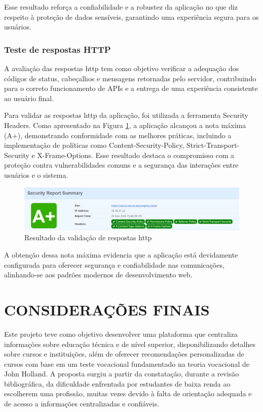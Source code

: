 Esse resultado reforça a confiabilidade e a robustez da aplicação no que diz respeito à proteção de dados sensíveis, garantindo uma experiência segura para os usuários.

\subsection{Teste de respostas HTTP}
A avaliação das respostas \ac{http} tem como objetivo verificar a adequação dos códigos de status, cabeçalhos e mensagens retornadas pelo servidor, contribuindo para o correto funcionamento de APIs e a entrega de uma experiência consistente ao usuário final.

Para validar as respostas \ac{http} da aplicação, foi utilizada a ferramenta Security Headers. Como apresentado na Figura \ref{fig:http}, a aplicação alcançou a nota máxima (A+), demonstrando conformidade com as melhores práticas, incluindo a implementação de políticas como Content-Security-Policy, Strict-Transport-Security e X-Frame-Options. Esse resultado destaca o compromisso com a proteção contra vulnerabilidades comuns e a segurança das interações entre usuários e o sistema.

\begin{figure}[ht]
        \centering
\includegraphics[width=1.0\textwidth]{images/http.png}
        \caption{Resultado da validação de respostas http}
        \label{fig:http}
\end{figure}


A obtenção dessa nota máxima evidencia que a aplicação está devidamente configurada para oferecer segurança e confiabilidade nas comunicações, alinhando-se aos padrões modernos de desenvolvimento web.


\chapter{CONSIDERAÇÕES FINAIS}

Este projeto teve como objetivo desenvolver uma plataforma que centraliza informações sobre educação técnica e de nível superior, disponibilizando detalhes sobre cursos e instituições, além de oferecer recomendações personalizadas de cursos com base em um teste vocacional fundamentado na teoria vocacional de John Holland. A proposta surgiu a partir da constatação, durante a revisão bibliográfica, da dificuldade enfrentada por estudantes de baixa renda ao escolherem uma profissão, muitas vezes devido à falta de orientação adequada e de acesso a informações centralizadas e confiáveis.

